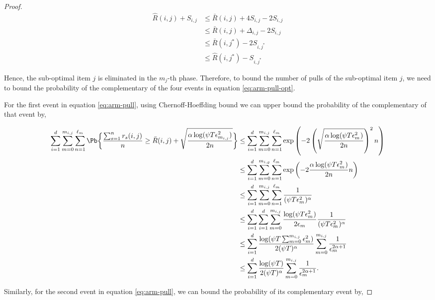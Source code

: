 \begin{proof}
\begin{align*}
\hat{R}(i,j) + S_{i,j} &\leq \bar{R}(i,j) + 4S_{i,j} - 2S_{i,j} \\
&\leq \bar{R}(i,j) + \Delta_{i,j} - 2S_{i,j}\\
& \leq \bar{R}(i,j^*) - 2S_{i,j^*} \\
&\leq \hat{R}(i,j^*) - S_{i , j^*}
\end{align*}

Hence, the sub-optimal item $j$ is eliminated in the $m_{j}$-th phase. Therefore, to bound the number of pulls of the sub-optimal item $j$, we need to bound the probability of the complementary of the four events in equation \ref{eq:arm-pull-opt}.

For the first event in equation \ref{eq:arm-pull}, using Chernoff-Hoeffding bound we can upper bound the probability of the complementary of that event by,

\begin{align*}
\sum_{i=1}^{d}\sum_{m=0}^{m_{i,j}}\sum_{n=1}^{\ell_{m_{}}}\Pb\bigg\lbrace \dfrac{\sum_{s=1}^{n} r_{s}(i,j)}{n} \geq  \bar{R}(i,j) + \sqrt{\dfrac{\alpha\log(\psi T\epsilon_{m_{i,j}}^2)}{2n}} \bigg\rbrace & \leq \sum_{i=1}^{d}\sum_{m=0}^{m_{i,j}}\sum_{n=1}^{\ell_{m_{}}}\exp\left(-2 \left(\sqrt{\dfrac{\alpha\log(\psi T\epsilon_{m_{}}^2)}{2n}}\right)^2 n \right)\\
&\leq \sum_{i=1}^{d}\sum_{m=0}^{m_{i,g}}\sum_{n=1}^{\ell_{m_{}}}\exp\left(-2\dfrac{\alpha\log(\psi T\epsilon_{m_{}}^2)}{2n}n \right)\\
&\leq \sum_{i=1}^{d}\sum_{m=0}^{m_{i,j}}\sum_{n=1}^{\ell_{m_{}}}\dfrac{1}{(\psi T\epsilon_{m_{}}^2)^{\alpha}} \\
&\leq \sum_{i=1}^{d}\sum_{i=1}^{d}\sum_{m=0}^{m_{i,j}}\dfrac{\log(\psi T\epsilon_{m_{}}^2)}{2\epsilon_{m_{}}}\dfrac{1}{(\psi T\epsilon_{m_{}}^2)^{\alpha}} \\
&\leq \sum_{i=1}^{d} \dfrac{\log(\psi T  \sum_{m=0}^{m_{i,j}}\epsilon_{m}^2)}{2(\psi T)^{\alpha}}\sum_{m=0}^{m_{i,j}}\dfrac{1}{\epsilon_{m_{}}^{2\alpha +1}} \\
&\leq \sum_{i=1}^{d}\dfrac{\log(\psi T)}{2(\psi T)^{\alpha}}\sum_{m=0}^{m_{i,j}}\dfrac{1}{\epsilon_{m_{}}^{2\alpha +1}}.
\end{align*}

Similarly, for the second event in equation \ref{eq:arm-pull}, we can bound the probability of its complementary event by,


\end{proof}
